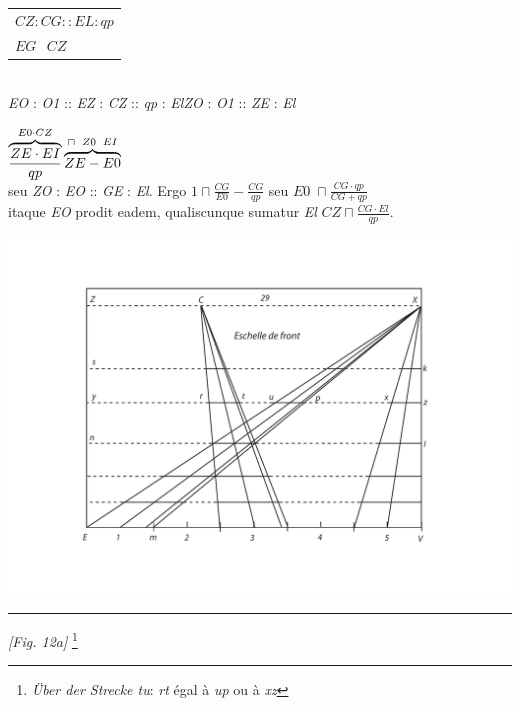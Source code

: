 \protect\begin{tabular}{l}$CZ:CG::EL:qp$\\$EG\hspace{9pt}CZ$\protect\end{tabular}\\\textit{EO} : \textit{O1} :: \textit{EZ} : \textit{CZ} :: \textit{qp} : \textit{El}\textit{ZO} : \textit{O1} :: \textit{ZE} : \textit{El} \\\rule[-4mm]{0mm}{10mm} $\protect\overbrace{\frac{ZE\cdot EI}{qp}}^{E0\cdot CZ}\protect\overbrace{ZE - E0}^{\sqcap\hspace{5pt} Z0\hspace{5pt}EI}$ \\seu \textit{ZO} : \textit{EO} :: \textit{GE} : \textit{El}. Ergo $\displaystyle 1\sqcap\frac{CG}{E0} - \frac{CG}{qp}$ seu $\displaystyle E0\; \sqcap \frac{CG\cdot qp}{CG+qp}$ \\itaque \textit{EO} prodit eadem, qualiscunque sumatur \textit{El} $\displaystyle CZ \sqcap \frac{CG \cdot El}{qp}$.\rule[-4mm]{0mm}{10mm}\pend
\addtocounter{footnote}{1}
\protect\clearpage
\begin{center}
\includegraphics[width=1.0\textwidth]{images/T29-Desargues_87_a}\end{center}
\protect\rule[0cm]{6cm}{0cm}\textit{[Fig. 12a]}
\footnote{\textit{\"{U}ber der Strecke tu}: \textit{rt} \'{e}gal \`{a} \textit{up} ou \`{a} \textit{xz}}
\protect\clearpage
